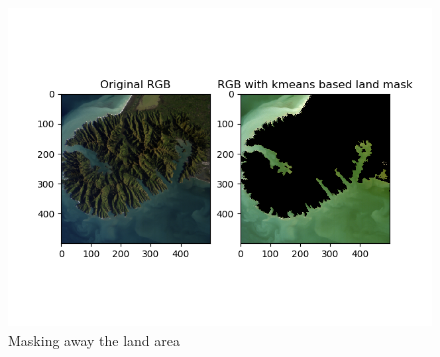 \begin{figure}[h!]
    \centering
    \includegraphics[width=\textwidth]{../fig/rgb_masked.png}
    \caption{Masking away the land area}
    \label{fig:mask_rgb}
\end{figure}

